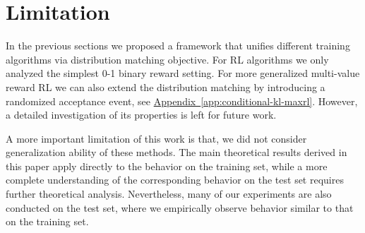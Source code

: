 \section{Limitation}

In the previous sections we proposed a framework that unifies different training algorithms via distribution matching objective. For RL algorithms we only analyzed the simplest 0-1 binary reward setting. For more generalized multi-value reward RL we can also extend the distribution matching by introducing a randomized acceptance event, see \hyperref[app:conditional-kl-maxrl]{Appendix~\ref*{app:conditional-kl-maxrl}}. However, a detailed investigation of its properties is left for future work.

A more important limitation of this work is that, we did not consider generalization ability of these methods. The main theoretical results derived in this paper apply directly to the behavior on the training set, while a more complete understanding of the corresponding behavior on the test set requires further theoretical analysis. Nevertheless, many of our experiments are also conducted on the test set, where we empirically observe behavior similar to that on the training set.

